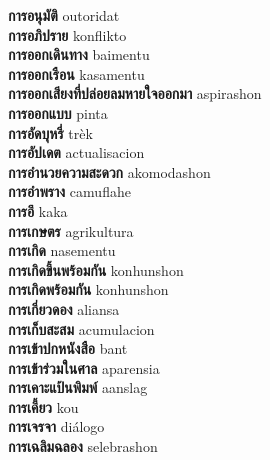\textbf{ การอนุมัติ  } outoridat \\
\textbf{ การอภิปราย  } konflikto \\
\textbf{ การออกเดินทาง  } baimentu \\
\textbf{ การออกเรือน  } kasamentu \\
\textbf{ การออกเสียงที่ปล่อยลมหายใจออกมา  } aspirashon \\
\textbf{ การออกแบบ  } pinta \\
\textbf{ การอัดบุหรี่  } trèk \\
\textbf{ การอัปเดต  } actualisacion \\
\textbf{ การอำนวยความสะดวก  } akomodashon \\
\textbf{ การอำพราง  } camuflahe \\
\textbf{ การอึ  } kaka \\
\textbf{ การเกษตร  } agrikultura \\
\textbf{ การเกิด  } nasementu \\
\textbf{ การเกิดขึ้นพร้อมกัน  } konhunshon \\
\textbf{ การเกิดพร้อมกัน  } konhunshon \\
\textbf{ การเกี่ยวดอง  } aliansa \\
\textbf{ การเก็บสะสม  } acumulacion \\
\textbf{ การเข้าปกหนังสือ  } bant \\
\textbf{ การเข้าร่วมในศาล  } aparensia \\
\textbf{ การเคาะแป้นพิมพ์  } aanslag \\
\textbf{ การเคี้ยว  } kou \\
\textbf{ การเจรจา  } diálogo \\
\textbf{ การเฉลิมฉลอง  } selebrashon \\
